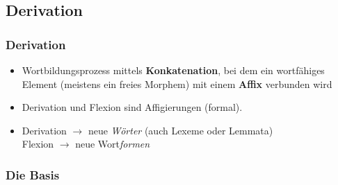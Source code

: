\subsection{Derivation}


\begin{frame}
\frametitle{Derivation}


	\begin{itemize}
		\item Wortbildungsprozess mittels \textbf{Konkatenation}, bei dem ein wortfähiges Element (meistens ein freies Morphem) mit einem \textbf{Affix} verbunden wird

		\item Derivation und Flexion sind Affigierungen (formal).

		\item 	Derivation $\rightarrow$ neue \emph{Wörter} (auch Lexeme oder Lemmata)\\
		Flexion $\rightarrow$ neue Wort\emph{formen}
	
	\end{itemize}
	
\end{frame}



\subsubsection{Die Basis}


